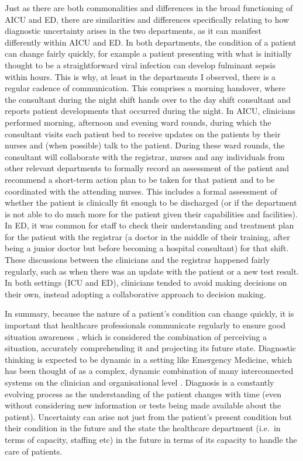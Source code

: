 \documentclass[a4paper, nobind]{templates/ociamthesis}
\begin{document}
Just as there are both commonalities and differences in the broad functioning of AICU and ED, there are similarities and differences specifically relating to how diagnostic uncertainty arises in the two departments, as it can manifest differently within AICU and ED. In both departments, the condition of a patient can change fairly quickly, for example a patient presenting with what is initially thought to be a straightforward viral infection can develop fulminant sepsis within hours. This is why, at least in the departments I observed, there is a regular cadence of communication. This comprises a morning handover, where the consultant during the night shift hands over to the day shift consultant and reports patient developments that occurred during the night. In AICU, clinicians performed morning, afternoon and evening ward rounds, during which the consultant visits each patient bed to receive updates on the patients by their nurses and (when possible) talk to the patient. During these ward rounds, the consultant will collaborate with the registrar, nurses and any individuals from other relevant departments to formally record an assessment of the patient and recommend a short-term action plan to be taken for that patient and to be coordinated with the attending nurses. This includes a formal assessment of whether the patient is clinically fit enough to be discharged (or if the department is not able to do much more for the patient given their capabilities and facilities). In ED, it was common for staff to check their understanding and treatment plan for the patient with the registrar (a doctor in the middle of their training, after being a junior doctor but before becoming a hospital consultant) for that shift. These discussions between the clinicians and the registrar happened fairly regularly, such as when there was an update with the patient or a new test result. In both settings (ICU and ED), clinicians tended to avoid making decisions on their own, instead adopting a collaborative approach to decision making.

\hfill\break
In summary, because the nature of a patient's condition can change quickly, it is important that healthcare professionals communicate regularly to ensure good situation awareness \autocite{endsley_toward_1995}, which is considered the combination of perceiving a situation, accurately comprehending it and projecting its future state. Diagnostic thinking is expected to be dynamic in a setting like Emergency Medicine, which has been thought of as a complex, dynamic combination of many interconnected systems on the clinician and organisational level \autocite{widmer_complex_2018}. Diagnosis is a constantly evolving process as the understanding of the patient changes with time (even without considering new information or tests being made available about the patient). Uncertainty can arise not just from the patient's present condition but their condition in the future and the state the healthcare department (i.e.~in terms of capacity, staffing etc) in the future in terms of its capacity to handle the care of patients.
\end{document}
